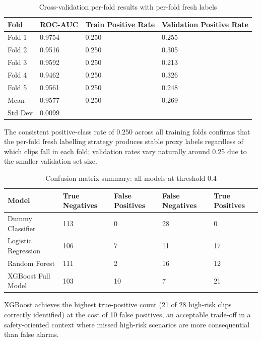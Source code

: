 \documentclass[11pt,a4paper]{article}
\begin{document}
\begin{table}[H]
\centering\small
\caption{Cross-validation per-fold results with per-fold fresh labels}
\begin{tabularx}{\textwidth}{LLLL}
\toprule
\textbf{Fold} & \textbf{ROC-AUC} & \textbf{Train Positive Rate} & \textbf{Validation Positive Rate} \\
\midrule
Fold 1 & 0.9754 & 0.250 & 0.255 \\
Fold 2 & 0.9516 & 0.250 & 0.305 \\
Fold 3 & 0.9592 & 0.250 & 0.213 \\
Fold 4 & 0.9462 & 0.250 & 0.326 \\
Fold 5 & 0.9561 & 0.250 & 0.248 \\
Mean & 0.9577 & 0.250 & 0.269 \\
Std Dev & 0.0099 &  &  \\
\bottomrule
\end{tabularx}
\end{table}

The consistent positive-class rate of 0.250 across all training folds confirms that the per-fold fresh labelling strategy produces stable proxy labels regardless of which clips fall in each fold; validation rates vary naturally around 0.25 due to the smaller validation set size.

\begin{table}[H]
\centering\small
\caption{Confusion matrix summary: all models at threshold 0.4}
\begin{tabularx}{\textwidth}{LLLLL}
\toprule
\textbf{Model} & \textbf{True Negatives} & \textbf{False Positives} & \textbf{False Negatives} & \textbf{True Positives} \\
\midrule
Dummy Classifier & 113 & 0 & 28 & 0 \\
Logistic Regression & 106 & 7 & 11 & 17 \\
Random Forest & 111 & 2 & 16 & 12 \\
XGBoost Full Model & 103 & 10 & 7 & 21 \\
\bottomrule
\end{tabularx}
\end{table}

XGBoost achieves the highest true-positive count (21 of 28 high-risk clips correctly identified) at the cost of 10 false positives, an acceptable trade-off in a safety-oriented context where missed high-risk scenarios are more consequential than false alarms.
\end{document}
